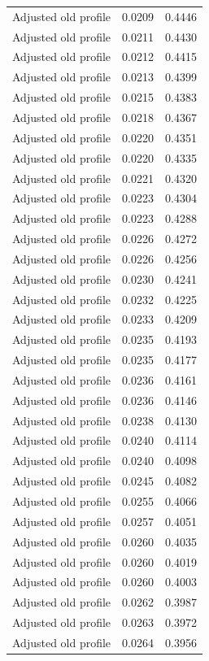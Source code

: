 \begin{table}[htbp]
\begin{tabular}{lll}
Adjusted old profile & 0.0209 & 0.4446 \\
Adjusted old profile & 0.0211 & 0.4430 \\
Adjusted old profile & 0.0212 & 0.4415 \\
Adjusted old profile & 0.0213 & 0.4399 \\
Adjusted old profile & 0.0215 & 0.4383 \\
Adjusted old profile & 0.0218 & 0.4367 \\
Adjusted old profile & 0.0220 & 0.4351 \\
Adjusted old profile & 0.0220 & 0.4335 \\
Adjusted old profile & 0.0221 & 0.4320 \\
Adjusted old profile & 0.0223 & 0.4304 \\
Adjusted old profile & 0.0223 & 0.4288 \\
Adjusted old profile & 0.0226 & 0.4272 \\
Adjusted old profile & 0.0226 & 0.4256 \\
Adjusted old profile & 0.0230 & 0.4241 \\
Adjusted old profile & 0.0232 & 0.4225 \\
Adjusted old profile & 0.0233 & 0.4209 \\
Adjusted old profile & 0.0235 & 0.4193 \\
Adjusted old profile & 0.0235 & 0.4177 \\
Adjusted old profile & 0.0236 & 0.4161 \\
Adjusted old profile & 0.0236 & 0.4146 \\
Adjusted old profile & 0.0238 & 0.4130 \\
Adjusted old profile & 0.0240 & 0.4114 \\
Adjusted old profile & 0.0240 & 0.4098 \\
Adjusted old profile & 0.0245 & 0.4082 \\
Adjusted old profile & 0.0255 & 0.4066 \\
Adjusted old profile & 0.0257 & 0.4051 \\
Adjusted old profile & 0.0260 & 0.4035 \\
Adjusted old profile & 0.0260 & 0.4019 \\
Adjusted old profile & 0.0260 & 0.4003 \\
Adjusted old profile & 0.0262 & 0.3987 \\
Adjusted old profile & 0.0263 & 0.3972 \\
Adjusted old profile & 0.0264 & 0.3956 \\

\end{tabular}
\end{table}
